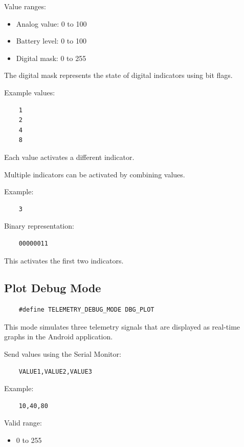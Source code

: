 Value ranges:

\begin{itemize}
	\item Analog value: 0 to 100
	\item Battery level: 0 to 100
	\item Digital mask: 0 to 255
\end{itemize}

The digital mask represents the state of digital indicators using bit flags.

Example values:

\begin{verbatim}
	1
	2
	4
	8
\end{verbatim}

Each value activates a different indicator.

Multiple indicators can be activated by combining values.

Example:

\begin{verbatim}
	3
\end{verbatim}

Binary representation:

\begin{verbatim}
	00000011
\end{verbatim}

This activates the first two indicators.

\subsection{Plot Debug Mode}

\begin{verbatim}
	#define TELEMETRY_DEBUG_MODE DBG_PLOT
\end{verbatim}

This mode simulates three telemetry signals that are displayed as
real-time graphs in the Android application.

Send values using the Serial Monitor:

\begin{verbatim}
	VALUE1,VALUE2,VALUE3
\end{verbatim}

Example:

\begin{verbatim}
	10,40,80
\end{verbatim}

Valid range:

\begin{itemize}
	\item 0 to 255
\end{itemize}

